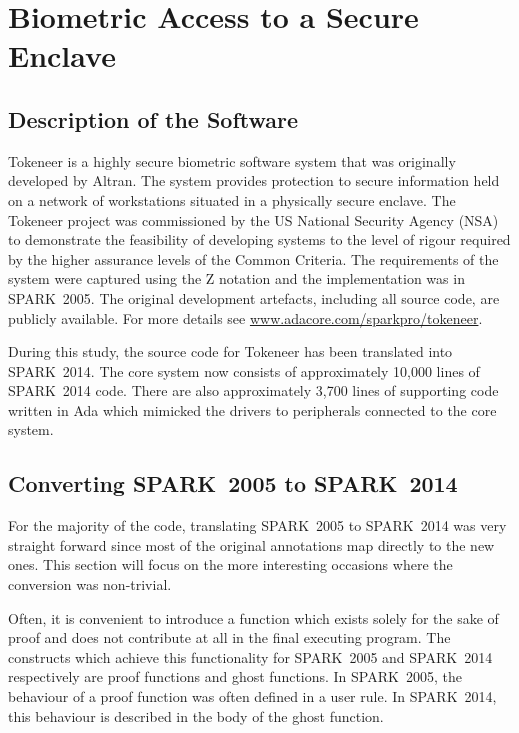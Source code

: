 \documentclass[10pt,a4paper,twocolumn]{article}
\newcommand{\oldspark}{SPARK~2005\xspace}
\newcommand{\newspark}{SPARK~2014\xspace}
\begin{document}
\section{Biometric Access to a Secure Enclave}


\subsection{Description of the Software}

Tokeneer is a highly secure biometric software system that was
originally developed by Altran. The system provides protection to
secure information held on a network of workstations situated in a
physically secure enclave. The Tokeneer project was commissioned by
the US National Security Agency (NSA) to demonstrate the feasibility
of developing systems to the level of rigour required by the higher
assurance levels of the Common Criteria. The requirements of the
system were captured using the Z notation and the implementation was
in \oldspark. The original development artefacts, including all source
code, are publicly available. For more details see
\url{www.adacore.com/sparkpro/tokeneer}.

During this study, the source code for Tokeneer has been translated
into \newspark. The core system now consists of approximately 10,000
lines of \newspark code. There are also approximately 3,700 lines of
supporting code written in Ada which mimicked the drivers to
peripherals connected to the core system.

\subsection{Converting \oldspark to \newspark}

For the majority of the code, translating \oldspark to \newspark was
very straight forward since most of the original annotations map
directly to the new ones. This section will focus on the more
interesting occasions where the conversion was non-trivial.

Often, it is convenient to introduce a function which exists
solely for the sake of proof and does not contribute at all in
the final executing program. The constructs which achieve this
functionality for \oldspark and \newspark respectively are proof
functions and ghost functions. In \oldspark, the behaviour of a proof
function was often defined in a user rule. In \newspark, this
behaviour is described in the body of the ghost function.
\end{document}
